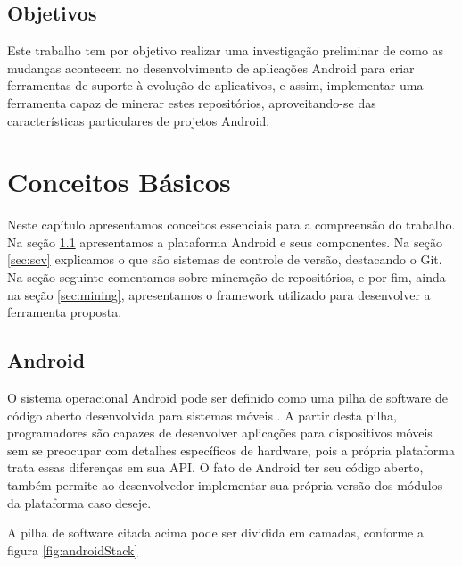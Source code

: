 \documentclass[a4paper,12pt]{article}
\begin{document}

\subsection{Objetivos}

Este trabalho tem por objetivo realizar uma investigação preliminar de como as mudanças acontecem no desenvolvimento de aplicações Android para criar ferramentas de suporte à evolução de aplicativos, e assim, implementar uma ferramenta capaz de minerar estes repositórios, aproveitando-se das características particulares de projetos Android.\\



\newpage

\section{Conceitos Básicos}

Neste capítulo apresentamos conceitos essenciais para a compreensão do trabalho. Na seção \ref{sec:android} apresentamos a plataforma Android e seus componentes. Na seção \ref{sec:scv} explicamos o que são sistemas de controle de versão, destacando o Git.  Na seção seguinte comentamos sobre mineração de repositórios, e por fim, ainda na seção \ref{sec:mining}, apresentamos o framework utilizado para desenvolver a ferramenta proposta.

\subsection{Android}%
\label{sec:android}
O sistema operacional Android pode ser definido como uma pilha de software de código aberto desenvolvida para sistemas móveis \cite{androidSource}. A partir desta pilha, programadores são capazes de desenvolver aplicações para dispositivos móveis sem se preocupar com detalhes específicos de hardware, pois a própria plataforma trata essas diferenças em sua API. O fato de Android ter seu código aberto, também permite ao desenvolvedor implementar sua própria versão dos módulos da plataforma caso deseje.

A pilha de software citada acima pode ser dividida em camadas, conforme a figura \ref{fig:androidStack}
\end{document}
